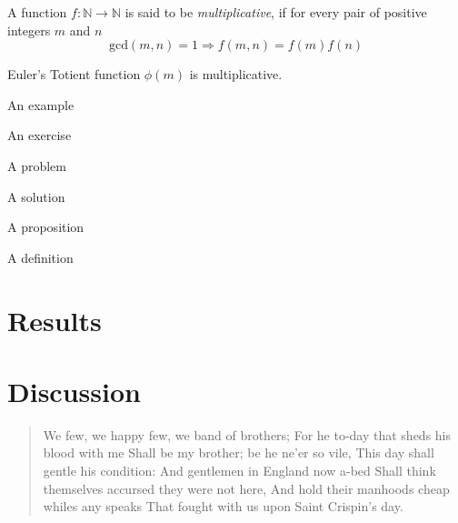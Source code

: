 \documentclass[
final
]{sta-thesis}
\begin{document}
\begin{definition}
A function $f:\mathbb{N}\rightarrow\mathbb{N}$ is said to be \emph{multiplicative}, if for every pair of positive integers $m$ and $n$
\[
\mathrm{gcd}(m,n)=1\Rightarrow f(m,n)=f(m)f(n)
\]
\end{definition}

\begin{lemma}
Euler's Totient function $\phi(m)$ is multiplicative.
\end{lemma}

\begin{example}
An example
\end{example}

\begin{exercise}
An exercise
\end{exercise}

\begin{problem}
A problem
\end{problem}

\begin{solution}
A solution
\end{solution}

\begin{proposition}
A proposition
\end{proposition}


\begin{definition}
A definition
\end{definition}

\begin{note}
\lipsum[1]
\end{note}

\begin{remark}
\lipsum[1]
\end{remark}

\chapter{Results}

\lipsum
\chapter{Discussion}

\begin{quote}
We few, we happy few, we band of brothers;
For he to-day that sheds his blood with me
Shall be my brother; be he ne'er so vile,
This day shall gentle his condition:
And gentlemen in England now a-bed
Shall think themselves accursed they were not here,
And hold their manhoods cheap whiles any speaks
That fought with us upon Saint Crispin's day.
\end{quote}
\end{document}
